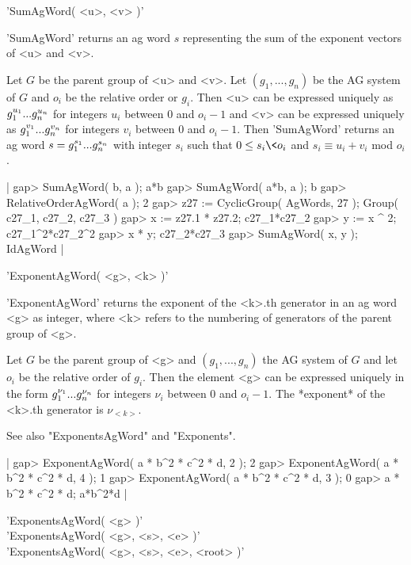 
'SumAgWord( <u>, <v> )'

'SumAgWord' returns an ag  word $s$ representing the  sum of the exponent
vectors of <u> and <v>.

Let $G$ be the parent group of <u> and <v>.  Let $(g_1, ..., g_n)$ be the
AG system of $G$ and $o_i$ be the relative order or $g_i$.  Then  <u> can
be expressed uniquely as $g_1^{u_1}\* ...\* g_n^{u_n}$ for integers $u_i$
between $0$ and $o_i-1$ and <v> can be expressed uniquely as $g_1^{v_1}\*
...\*  g_n^{v_n}$ for integers  $v_i$  between  $0$  and  $o_i-1$.   Then
'SumAgWord'  returns an ag word  $s =  g_1^{s_1}\*  ...\* g_n^{s_n}$ with
integer $s_i$  such that $0 \leq s_i \< o_i$ and  $s_i \equiv u_i  + v_i$
mod $o_i$.

|    gap> SumAgWord( b, a );
    a*b
    gap> SumAgWord( a*b, a );
    b
    gap> RelativeOrderAgWord( a );
    2 
    gap> z27 := CyclicGroup( AgWords, 27 );
    Group( c27_1, c27_2, c27_3 )
    gap> x := z27.1 * z27.2;
    c27_1*c27_2
    gap> y := x ^ 2;
    c27_1^2*c27_2^2
    gap> x * y;
    c27_2*c27_3
    gap> SumAgWord( x, y );
    IdAgWord |


'ExponentAgWord( <g>, <k> )'

'ExponentAgWord' returns  the exponent of the <k>.th generator in  an  ag
word <g> as integer,  where <k>  refers to the numbering of generators of
the parent group of <g>.

Let $G$ be the parent group of <g> and $(g_1, ..., g_n)$ the AG system of
$G$ and let $o_i$ be the  relative order  of $g_i$.  Then the element <g>
can be  expressed uniquely in the form $g_1^{\nu_1}\* ...\*  g_n^{\nu_n}$
for integers  $\nu_i$  between  $0$  and $o_i-1$.  The *exponent*  of the
<k>.th generator is $\nu_{<k>}$.

See also "ExponentsAgWord" and "Exponents".

|    gap> ExponentAgWord( a * b^2 * c^2 * d, 2 );
    2
    gap> ExponentAgWord( a * b^2 * c^2 * d, 4 );
    1
    gap> ExponentAgWord( a * b^2 * c^2 * d, 3 );
    0
    gap> a * b^2 * c^2 * d;
    a*b^2*d |


'ExponentsAgWord( <g> )'\\
'ExponentsAgWord( <g>, <s>, <e> )'\\
'ExponentsAgWord( <g>, <s>, <e>, <root> )'


